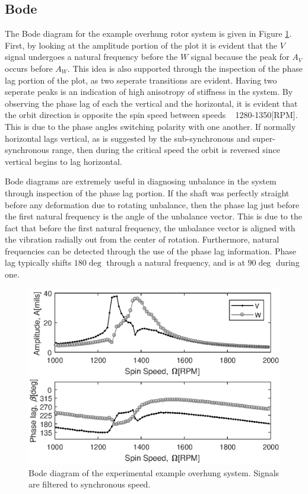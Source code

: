 \subsection{Bode}
The Bode diagram for the example overhung rotor system is given in Figure \ref{fig:ExpExampleBode}. First, by looking at the amplitude portion of the plot it is evident that the $ V $ signal undergoes a natural frequency before the $ W $ signal because the peak for $ A_V $ occurs before $ A_W $. This idea is also supported through the inspection of the phase lag portion of the plot, as two seperate transitions are evident. Having two seperate peaks is an indication of high anisotropy of stiffness in the system. By observing the phase lag of each the vertical and the horizontal, it is evident that the orbit direction is opposite the spin speed between speeds ~ 1280-1350[RPM]. This is due to the phase angles switching polarity with one another. If normally horizontal lags vertical, as is suggested by the sub-synchronous and super-synchronous range, then during the critical speed the orbit is reversed since vertical begins to lag horizontal.\par
Bode diagrams are extremely useful in diagnosing unbalance in the system through inspection of the phase lag portion. If the shaft was perfectly straight before any deformation due to rotating unbalance, then the phase lag just before the first natural frequency is the angle of the unbalance vector. This is due to the fact that before the first natural frequency, the unbalance vector is aligned with the vibration radially out from the center of rotation. Furthermore, natural frequencies can be detected through the use of the phase lag information. Phase lag typically shifts $ 180\deg $ through a natural frequency, and is at $ 90\deg $ during one.
\begin{figure}
	\centering
	\includegraphics[]{./figures/ExpExampleBode.eps}
	\caption{Bode diagram of the experimental example overhung system. Signals are filtered to synchronous speed.}
	\label{fig:ExpExampleBode}
\end{figure}
